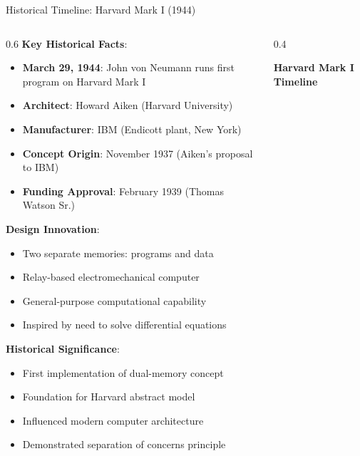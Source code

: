 \documentclass[aspectratio=169]{beamer}
\newcommand{\concept}[1]{\textbf{\color{darkblue}#1}}
\begin{document}
\begin{frame}{Historical Timeline: Harvard Mark I (1944)}
\begin{columns}
\begin{column}{0.6\textwidth}
\concept{Key Historical Facts}:
\begin{itemize}
\item \textbf{March 29, 1944}: John von Neumann runs first program on Harvard Mark I
\item \textbf{Architect}: Howard Aiken (Harvard University)
\item \textbf{Manufacturer}: IBM (Endicott plant, New York)
\item \textbf{Concept Origin}: November 1937 (Aiken's proposal to IBM)
\item \textbf{Funding Approval}: February 1939 (Thomas Watson Sr.)
\end{itemize}

\vspace{0.3cm}
\concept{Design Innovation}:
\begin{itemize}
\item Two separate memories: programs and data
\item Relay-based electromechanical computer
\item General-purpose computational capability
\item Inspired by need to solve differential equations
\end{itemize}

\vspace{0.3cm}
\concept{Historical Significance}:
\begin{itemize}
\item First implementation of dual-memory concept
\item Foundation for Harvard abstract model
\item Influenced modern computer architecture
\item Demonstrated separation of concerns principle
\end{itemize}
\end{column}
\begin{column}{0.4\textwidth}
\begin{center}
\textbf{Harvard Mark I Timeline}
\vspace{0.3cm}

\end{center}
\end{column}
\end{columns}
\end{frame}
\end{document}
